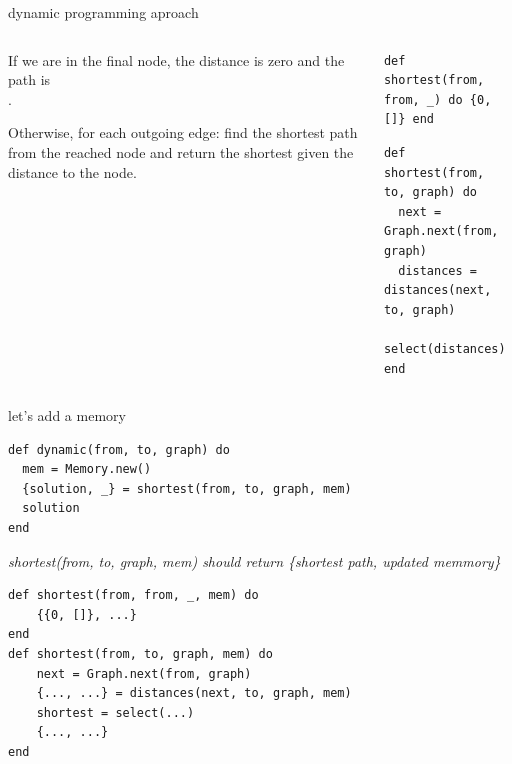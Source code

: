 \begin{frame}[fragile]{dynamic programming aproach}

\begin{columns}
 \begin{column}{0.4\linewidth}
  If we are in the final node, the distance is zero and the path is \[\].

  \vspace{10pt}
  Otherwise, for each outgoing edge: find the shortest path from the
  reached node and return the shortest given the distance to the node.

 \end{column}
 \begin{column}{0.6\linewidth}
   \begin{verbatim}
def shortest(from, from, _) do {0, []} end
  \end{verbatim}
  \pause
  \begin{verbatim}
def shortest(from, to, graph) do
  next = Graph.next(from, graph)
  distances = distances(next, to, graph)
  select(distances)
end
  \end{verbatim}
 \end{column}
\end{columns}

\pause\vspace{20pt}{\em What is the complexity?}

\end{frame}

\begin{frame}[fragile]{let's add a memory}

\begin{verbatim}
def dynamic(from, to, graph) do
  mem = Memory.new()
  {solution, _} = shortest(from, to, graph, mem)
  solution
end
\end{verbatim}

\pause\vspace{5pt}

{\em shortest(from, to, graph, mem) should return \{shortest path, updated memmory\}}

\pause\vspace{5pt}
\begin{verbatim}
def shortest(from, from, _, mem) do
    {{0, []}, ...}
end
def shortest(from, to, graph, mem) do
    next = Graph.next(from, graph)
    {..., ...} = distances(next, to, graph, mem)
    shortest = select(...)
    {..., ...}
end
\end{verbatim}

\end{frame}

